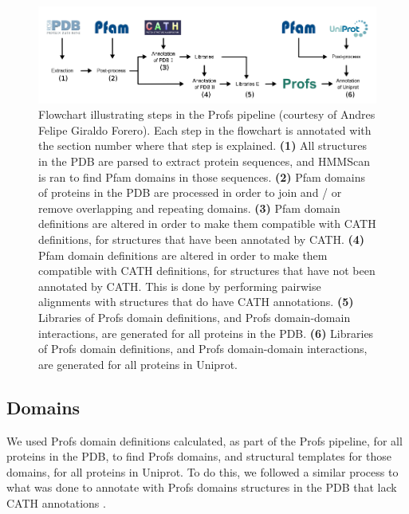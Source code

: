 \begin{figure}[t]
	\centering
	\includegraphics[width=1.0\linewidth]{static/profs/profs_pipeline.png}
	\caption[Profs pipeline.]{Flowchart illustrating steps in the Profs pipeline (courtesy of Andres Felipe Giraldo Forero). Each step in the flowchart is annotated with the section number where that step is explained. \textbf{(1)} All structures in the PDB are parsed to extract protein sequences, and HMMScan is ran to find Pfam domains in those sequences. \textbf{(2)} Pfam domains of proteins in the PDB are processed in order to join and / or remove overlapping and repeating domains. \textbf{(3)} Pfam domain definitions are altered in order to make them compatible with CATH definitions, for structures that have been annotated by CATH. \textbf{(4)} Pfam domain definitions are altered in order to make them compatible with CATH definitions, for structures that have not been annotated by CATH. This is done by performing pairwise alignments with structures that do have CATH annotations. \textbf{(5)} Libraries of Profs domain definitions, and Profs domain-domain interactions, are generated for all proteins in the PDB.  \textbf{(6)} Libraries of Profs domain definitions, and Profs domain-domain interactions, are generated for all proteins in Uniprot.}
	\label{fig:profs_pipeline}
\end{figure}


\subsection{Domains}

We used Profs domain definitions calculated, as part of the Profs pipeline, for all proteins in the PDB, to find Profs domains, and structural templates for those domains, for all proteins in Uniprot. To do this, we followed a similar process to what was done to annotate with Profs domains structures in the PDB that lack CATH annotations \cite{witvliet_elaspic_2016}.

